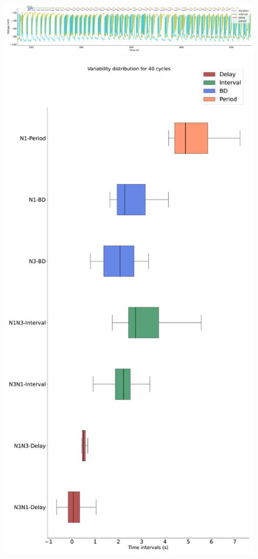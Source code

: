 \begin{figure}[htbp]
	\centering
	\begin{minipage}[b]{\textwidth}
		\centering
		\includegraphics[width=\textwidth]{./invariants/data/SUSSEX/CV1a_driven4/images/stim_cv1a4_signal_intervals_zoom.pdf}
	\end{minipage}
	\centering
	\begin{minipage}[b]{0.43\textwidth}
		\centering
		\includegraphics[width=\textwidth]{./invariants/data/SUSSEX/CV1a_driven4/images/stim_cv1a4_boxplot.pdf}

\end{minipage}
\end{figure}
